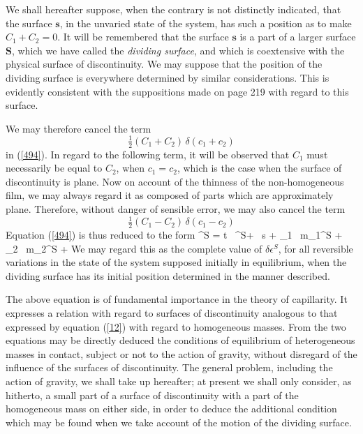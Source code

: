\documentclass[12pt]{article}
\newcommand{\dd}{\delta}
\begin{document}
{We shall hereafter suppose, when the contrary is not distinctly indicated, that the surface $\mathbf{s}$, in the unvaried state of the system, has such a position as to make $C_1+C_2=0$. It will be remembered that the surface $\mathbf{s}$ is a part of a larger surface $\mathbf{S}$, which we have called the \textit{dividing surface}, and which is coextensive with the physical surface of discontinuity. We may suppose that the position of the dividing surface is everywhere determined by similar considerations. This is evidently consistent with the suppositions made on page 219 with regard to this surface.

We may therefore cancel the term
$$ \tfrac{1}{2}(C_1+ C_2) \,\delta(c_1 + c_2)$$
in (\ref{494}). In regard to the following term, it will be observed that $C_1$ must necessarily be equal to $C_2$, when $c_1=c_2$, which is the case when the surface of discontinuity is plane. Now on account of the thinness of the non-homogeneous film, we may always regard it as composed of parts which are approximately plane. Therefore, without danger of sensible error, we may also cancel the term
$$ \tfrac{1}{2}(C_1- C_2) \,\delta(c_1 - c_2)$$
Equation (\ref{494}) is thus reduced to the form
\eqs \dd \epsilon^S = t \, \dd \eta^S+ \sigma \, \dd s + \mu_1 \, \dd m_1^S + \mu_2 \, \dd m_2^S +   \label{497} \eqe
We may regard this as the complete value of $\dd \epsilon^S$, for all reversible variations in the state of the system supposed initially in equilibrium, when the dividing surface has its initial position determined in the manner described.


The above equation is of fundamental importance in the theory of capillarity.  It expresses a relation with regard to surfaces of discontinuity analogous to that expressed by equation (\ref{12}) with regard to homogeneous masses. From the two equations may be directly deduced the conditions of equilibrium  of heterogeneous masses in contact, subject or not to the action of gravity, without disregard of the influence of the surfaces of discontinuity. The general problem, including the action of gravity, we shall take up hereafter; at present we shall only consider, as hitherto, a small part of a surface of discontinuity with a part of the homogeneous mass on either side, in order to deduce the additional condition which may be found when we take account of the motion of the dividing surface.


}
\end{document}
